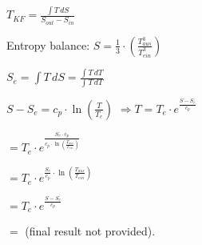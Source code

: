 \( T_{KF} = \frac{\int T \, dS}{S_{out} - S_{in}} \)  

Entropy balance:  
\( S = \frac{1}{3} \cdot \left( \frac{T_{aus}^3}{T_{ein}^3} \right) \)  

\( S_e = \int T \, dS = \frac{\int T \, dT}{\int T \, dT} \)  

\( S - S_e = c_p \cdot \ln \left( \frac{T}{T_e} \right) \)  
\( \Rightarrow T = T_e \cdot e^{\frac{S - S_e}{c_p}} \)  

\( = T_e \cdot e^{\frac{S_e \cdot c_p}{c_p \cdot \ln \left( \frac{T_{aus}}{T_{ein}} \right)}} \)  

\( = T_e \cdot e^{\frac{S_e}{c_p} \cdot \ln \left( \frac{T_{aus}}{T_{ein}} \right)} \)  

\( = T_e \cdot e^{\frac{S - S_e}{c_p}} \)  

\( = \) (final result not provided).